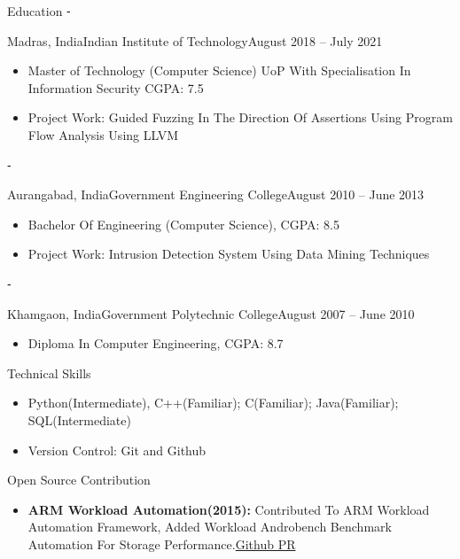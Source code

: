 \documentclass[]{mcdowellcv}
\begin{document}
	\begin{cvsection}{Education}
	⁃	\begin{cvsubsection}{Madras, India}{Indian Institute of Technology}{August 2018 -- July 2021}
			\begin{itemize}
				\item Master of Technology (Computer Science) UoP With Specialisation In Information Security CGPA: 7.5		
				\item Project Work: Guided Fuzzing In The Direction Of Assertions Using Program Flow Analysis Using LLVM 
			\end{itemize}
		\end{cvsubsection}
		
	⁃	\begin{cvsubsection}{Aurangabad, India}{Government Engineering College}{August 2010 -- June 2013}
			\begin{itemize}
				\item Bachelor Of Engineering (Computer Science), CGPA: 8.5
				\item Project Work: Intrusion Detection System Using Data Mining Techniques
			\end{itemize}
		\end{cvsubsection}
	⁃	\begin{cvsubsection}{Khamgaon, India}{Government Polytechnic College}{August 2007 -- June 2010}
			\begin{itemize}
				\item Diploma In Computer Engineering, CGPA: 8.7
			\end{itemize}
		\end{cvsubsection}
	\end{cvsection}
	
	\begin{cvsection}{Technical Skills}
		\begin{cvsubsection}{}{}{}	
			\begin{itemize}
				\item Python(Intermediate), C++(Familiar); C(Familiar); Java(Familiar); SQL(Intermediate)
				\item Version Control: Git and Github
			\end{itemize}
		\end{cvsubsection}
	\end{cvsection}
	
	\begin{cvsection}{Open Source Contribution}
		\begin{cvsubsection}{}{}{}	
			\begin{itemize}
				\item \textbf{ARM Workload Automation(2015):} Contributed To ARM Workload Automation Framework,  Added Workload Androbench Benchmark Automation For Storage Performance.\href{https://github.com/ARM-software/workload-automation/pull/45}{Github PR}

			\end{itemize}
		\end{cvsubsection}
	\end{cvsection}
	
\end{document}
